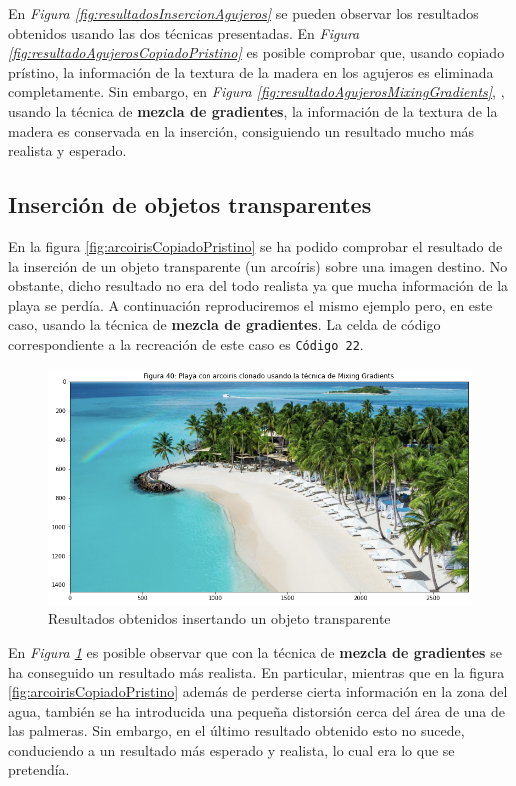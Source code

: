 \documentclass[11pt,twoside,titlepage,a4paper]{article}
\numberwithin{equation}{section} %
\theoremstyle{usual}
\begin{document}
En \textit{Figura \ref{fig:resultadosInsercionAgujeros}} se pueden observar los resultados obtenidos usando las dos técnicas presentadas. En \textit{Figura \ref{fig:resultadoAgujerosCopiadoPristino}} es posible comprobar que, usando copiado prístino, la información de la textura de la madera en los agujeros es eliminada completamente. Sin embargo, en \textit{Figura \ref{fig:resultadoAgujerosMixingGradients}}, , usando la técnica de \textbf{mezcla de gradientes}, la información de la textura de la madera es conservada en la inserción, consiguiendo un resultado mucho más realista y esperado.

\subsection{Inserción de objetos transparentes}
\label{subsection:InsercionObjetosTransparente}
En la figura \ref{fig:arcoirisCopiadoPristino} se ha podido comprobar el resultado de la inserción de un objeto transparente (un arcoíris) sobre una imagen destino. No obstante, dicho resultado no era del todo realista ya que mucha información de la playa se perdía. A continuación reproduciremos el mismo ejemplo pero, en este caso, usando la técnica de \textbf{mezcla de gradientes}. La celda de código correspondiente a la recreación de este caso es \texttt{Código 22}.

\begin{figure}[h]
    \centering
    \includegraphics[width=.7\textwidth]{imagenes/PoissonImageEditing_cell_53_output_0.png}
    \caption{Resultados obtenidos insertando un objeto transparente}
    \label{fig:resultadosObjetoTransparente}
\end{figure}

En \textit{Figura \ref{fig:resultadosObjetoTransparente}} es posible observar que con la técnica de \textbf{mezcla de gradientes} se ha conseguido un resultado más realista. En particular, mientras que en la figura \ref{fig:arcoirisCopiadoPristino} además de perderse cierta información en la zona del agua, también se ha introducida una pequeña distorsión cerca del área de una de las palmeras. Sin embargo, en el último resultado obtenido esto no sucede, conduciendo a un resultado más esperado y realista, lo cual era lo que se pretendía.
\end{document}
